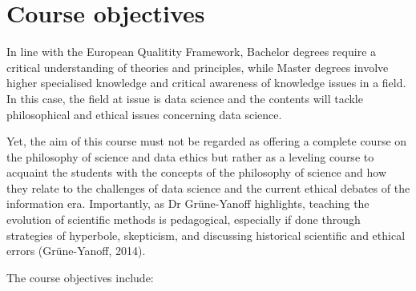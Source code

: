 \documentclass[
  12pt,
]{book}
\begin{document}
\section*{Course objectives}\label{course-objectives}

In line with the European Qualitity Framework, Bachelor degrees require a critical understanding of theories and principles, while Master degrees involve higher specialised knowledge and critical awareness of knowledge issues in a field. In this case, the field at issue is data science and the contents will tackle philosophical and ethical issues concerning data science.

Yet, the aim of this course must not be regarded as offering a complete course on the philosophy of science and data ethics but rather as a leveling course to acquaint the students with the concepts of the philosophy of science and how they relate to the challenges of data science and the current ethical debates of the information era. Importantly, as Dr Grüne-Yanoff highlights, teaching the evolution of scientific methods is pedagogical, especially if done through strategies of hyperbole, skepticism, and discussing historical scientific and ethical errors (Grüne-Yanoff, 2014).

The course objectives include:
\end{document}
